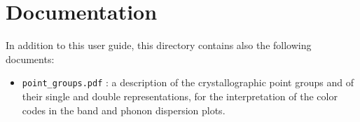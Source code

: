 \documentclass[12pt,a4paper]{article}
\begin{document}
\section{Documentation}

In addition to this user guide, this directory contains also the following
documents:

\begin{itemize}

\item
\texttt{point\_groups.pdf} : a description of the crystallographic point groups
and of their single and double representations, for the interpretation of
the color codes in the band and phonon dispersion plots.


\end{itemize}
\end{document}
